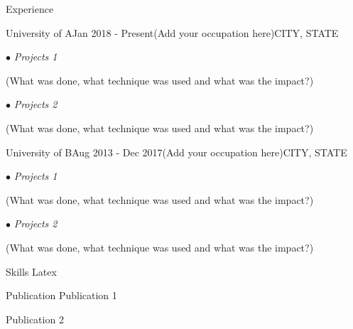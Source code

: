 \documentclass{resume} %
\begin{document}
\begin{rSection}{Experience}

\begin{rSubsection}{University of A}{Jan 2018 - Present}{(Add your occupation here)}{CITY, STATE}
\item[$\bullet$] \textit{Projects 1}
\item (What was done, what technique was used and what was the impact?)

\item[$\bullet$] \textit{Projects 2}
\item (What was done, what technique was used and what was the impact?)
\end{rSubsection}

\begin{rSubsection}{University of B}{Aug 2013 - Dec 2017}{(Add your occupation here)}{CITY, STATE}

\item[$\bullet$] \textit{Projects 1}
\item (What was done, what technique was used and what was the impact?)

\item[$\bullet$] \textit{Projects 2}
\item (What was done, what technique was used and what was the impact?)
\end{rSubsection}

\end{rSection}


\begin{rSection}{Skills}
Latex
\end{rSection}

\begin{rSection}{Publication}
Publication 1

Publication 2

\end{rSection}
\end{document}
